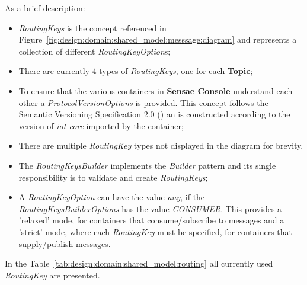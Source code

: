 As a brief description:

\begin{itemize}
   \item \textit{RoutingKeys} is the concept referenced in Figure~\ref{fig:design:domain:shared_model:messsage:diagram} and represents a collection of different \textit{RoutingKeyOption}s;
   \item There are currently 4 types of \textit{RoutingKeys}, one for each \textbf{Topic};
   \item To ensure that the various containers in \textbf{Sensae Console} understand each other a \textit{ProtocolVersionOptions} is provided. This concept follows the Semantic Versioning Specification 2.0 (\cite{semver}) an is constructed according to the version of \textit{iot-core} imported by the container;
   \item There are multiple \textit{RoutingKey} types not displayed in the diagram for brevity.
   \item The \textit{RoutingKeysBuilder} implements the \textit{Builder} pattern and its single responsibility is to validate and create \textit{RoutingKeys};
   \item A \textit{RoutingKeyOption} can have the value \textit{any}, if the \textit{RoutingKeysBuilderOptions} has the value \textit{CONSUMER}. This provides a 'relaxed' mode, for containers that consume/subscribe to messages and a 'strict' mode, where each \textit{RoutingKey} must be specified, for containers that supply/publish messages. 
\end{itemize}

In the Table~\ref{tab:design:domain:shared_model:routing} all currently used \textit{RoutingKey} are presented.

